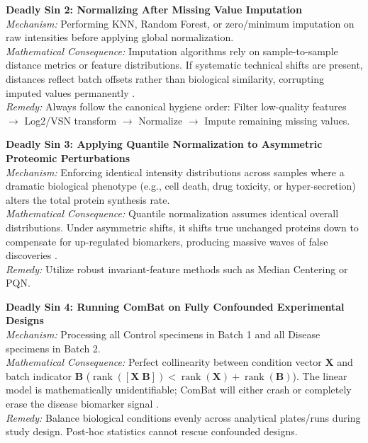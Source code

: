 \documentclass[11pt,oneside]{book}
\begin{document}
\begin{pitfallbox}
\textbf{Deadly Sin 2: Normalizing After Missing Value Imputation}\\
\textit{Mechanism:} Performing KNN, Random Forest, or zero/minimum imputation on raw intensities before applying global normalization.\\
\textit{Mathematical Consequence:} Imputation algorithms rely on sample-to-sample distance metrics or feature distributions. If systematic technical shifts are present, distances reflect batch offsets rather than biological similarity, corrupting imputed values permanently \cite{lazar2016accounting}.\\
\textit{Remedy:} Always follow the canonical hygiene order: Filter low-quality features $\to$ Log2/VSN transform $\to$ Normalize $\to$ Impute remaining missing values.
\end{pitfallbox}

\begin{pitfallbox}
\textbf{Deadly Sin 3: Applying Quantile Normalization to Asymmetric Proteomic Perturbations}\\
\textit{Mechanism:} Enforcing identical intensity distributions across samples where a dramatic biological phenotype (e.g., cell death, drug toxicity, or hyper-secretion) alters the total protein synthesis rate.\\
\textit{Mathematical Consequence:} Quantile normalization assumes identical overall distributions. Under asymmetric shifts, it shifts true unchanged proteins down to compensate for up-regulated biomarkers, producing massive waves of false discoveries \cite{valikangas2018systematic}.\\
\textit{Remedy:} Utilize robust invariant-feature methods such as Median Centering or PQN.
\end{pitfallbox}

\begin{pitfallbox}
\textbf{Deadly Sin 4: Running ComBat on Fully Confounded Experimental Designs}\\
\textit{Mechanism:} Processing all Control specimens in Batch 1 and all Disease specimens in Batch 2.\\
\textit{Mathematical Consequence:} Perfect collinearity between condition vector $\mathbf{X}$ and batch indicator $\mathbf{B}$ ($\operatorname{rank}([\mathbf{X}\; \mathbf{B}]) < \operatorname{rank}(\mathbf{X}) + \operatorname{rank}(\mathbf{B})$). The linear model is mathematically unidentifiable; ComBat will either crash or completely erase the disease biomarker signal \cite{nygaard2016methods}.\\
\textit{Remedy:} Balance biological conditions evenly across analytical plates/runs during study design. Post-hoc statistics cannot rescue confounded designs.
\end{pitfallbox}
\end{document}
